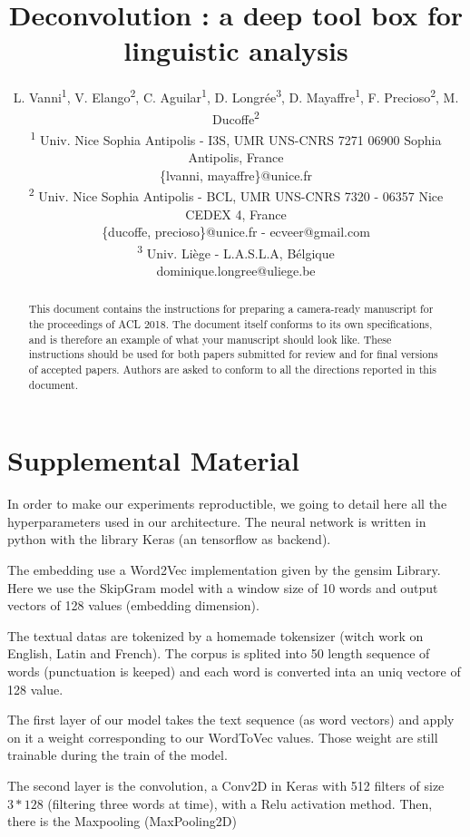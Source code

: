 \documentclass[11pt,a4paper]{article}
\title{Deconvolution : a deep tool box for linguistic analysis}
\author{
L. Vanni\textsuperscript{1}, V. Elango\textsuperscript{2}, C. Aguilar\textsuperscript{1}, D. Longrée\textsuperscript{3}, D. Mayaffre\textsuperscript{1}, F. Precioso\textsuperscript{2}, M. Ducoffe\textsuperscript{2}\\
  \textsuperscript{1} Univ. Nice Sophia Antipolis - I3S, UMR UNS-CNRS 7271 06900 Sophia Antipolis, France \\
  \{lvanni, mayaffre\}@unice.fr \\
  \textsuperscript{2} Univ. Nice Sophia Antipolis - BCL, UMR UNS-CNRS 7320 - 06357 Nice CEDEX 4, France \\
  \{ducoffe, precioso\}@unice.fr - ecveer@gmail.com \\
  \textsuperscript{3} Univ. Liège - L.A.S.L.A, Bélgique \\
  dominique.longree@uliege.be\\}
\date{}
\begin{document}
\maketitle
\begin{abstract}
  This document contains the instructions for preparing a camera-ready
  manuscript for the proceedings of ACL 2018. The document itself
  conforms to its own specifications, and is therefore an example of
  what your manuscript should look like. These instructions should be
  used for both papers submitted for review and for final versions of
  accepted papers.  Authors are asked to conform to all the directions
  reported in this document.
\end{abstract}














\appendix

\section{Supplemental Material}
\label{sec:supplemental}

In order to make our experiments reproductible, we going to detail here all the hyperparameters used in our architecture. The neural network is written in python with the library Keras (an tensorflow as backend). 

The embedding use a Word2Vec implementation given by the gensim Library. Here we use the SkipGram model with a window size of 10 words and output vectors of 128 values (embedding dimension).

The textual datas are tokenized by a homemade tokensizer (witch work on English, Latin and French). The corpus is splited into 50 length sequence of words (punctuation is keeped) and each word is converted inta an uniq vectore of 128 value.

The first layer of our model takes the text sequence (as word vectors) and apply on it a weight corresponding to our WordToVec values. Those weight are still trainable during the train of the model.

The second layer is the convolution, a Conv2D in Keras with 512 filters of size $3*128$ (filtering three words at time), with a Relu activation method. Then, there is the Maxpooling (MaxPooling2D) 
\end{document}

